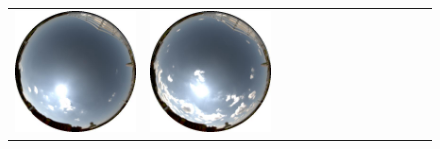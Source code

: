 \begin{figure}
\begin{tabular}{@{}rcccccccccccc@{}}
    \includegraphics[width=\customwidth]{./figures/database/20130824_120033.jpg} &
    \includegraphics[width=\customwidth]{./figures/database/20130824_123024.jpg} &

\end{tabular}
\end{figure}
